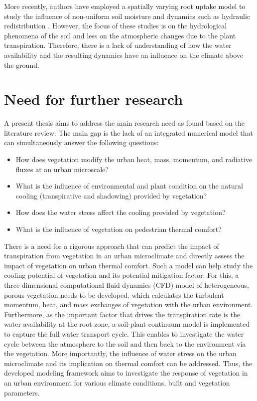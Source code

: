 More recently, authors have employed a spatially varying root uptake model to study the influence of non-uniform soil moisture and dynamics such as hydraulic redistribution \citep{Volpe2013,Manoli2014a,Huang2017, Lai2000, Manoli2014}. However, the focus of these studies is on the hydrological phenomena of the soil and less on the atmospheric changes due to the plant transpiration. Therefore, there is a lack of understanding of how the water availability and the resulting dynamics have an influence on the climate above the ground. 
	
\section{Need for further research}

A present thesis aims to address the main research need as found based on the literature review. The main gap is the lack of an integrated numerical model that can simultaneously answer the following questions:
\begin{itemize}
	\item How does vegetation modify the urban heat, mass, momentum, and radiative fluxes at an urban microscale?
	\item What is the influence of environmental and plant condition on the natural cooling (transpirative and shadowing) provided by vegetation?
	\item How does the water stress affect the cooling provided by vegetation?
	\item What is the influence of vegetation on pedestrian thermal comfort?
\end{itemize}

There is a need for a rigorous approach that can predict the impact of transpiration from vegetation in an urban microclimate and directly assess the impact of vegetation on urban thermal comfort. Such a model can help study the cooling potential of vegetation and its potential mitigation factor. For this, a three-dimensional computational fluid dynamics (CFD) model of heterogeneous, porous vegetation needs to be developed, which calculates the turbulent momentum, heat, and mass exchanges of vegetation with the urban environment. Furthermore, as the important factor that drives the transpiration rate is the water availability at the root zone, a soil-plant continuum model is implemented to capture the full water transport cycle. This enables to investigate the water cycle between the atmosphere to the soil and then back to the environment via the vegetation. More importantly, the influence of water stress on the urban microclimate and its implication on thermal comfort can be addressed. Thus, the developed modeling framework aims to investigate the response of vegetation in an urban environment for various climate conditions, built and vegetation parameters.

